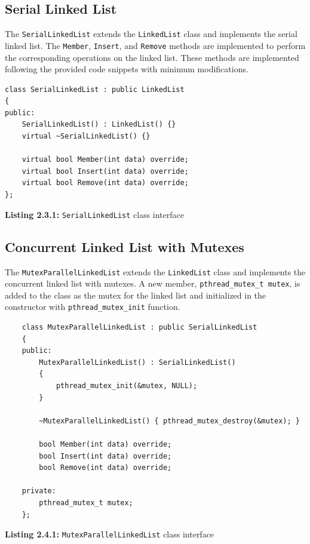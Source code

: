 \documentclass[a4paper,12pt]{article}
\begin{document}
\subsection{Serial Linked List}

The \lstinline|SerialLinkedList| extends the \lstinline|LinkedList| class and implements the serial linked list. The \lstinline|Member|, \lstinline|Insert|, and \lstinline|Remove| methods are implemented to perform the corresponding operations on the linked list. These methods are implemented following the provided code snippets with minimum modifications.

\begin{lstlisting}
class SerialLinkedList : public LinkedList
{
public:
    SerialLinkedList() : LinkedList() {}
    virtual ~SerialLinkedList() {}

    virtual bool Member(int data) override;
    virtual bool Insert(int data) override;
    virtual bool Remove(int data) override;
};
\end{lstlisting}
\begin{center}
    \textbf{Listing 2.3.1:} \lstinline|SerialLinkedList| class interface
\end{center}

\subsection{Concurrent Linked List with Mutexes}

The \lstinline|MutexParallelLinkedList| extends the \lstinline|LinkedList| class and implements the concurrent linked list with mutexes. A new member, \lstinline|pthread_mutex_t mutex|, is added to the class as the mutex for the linked list and initialized in the constructor with \lstinline|pthread_mutex_init| function.

\begin{lstlisting}
    class MutexParallelLinkedList : public SerialLinkedList
    {
    public:
        MutexParallelLinkedList() : SerialLinkedList()
        {
            pthread_mutex_init(&mutex, NULL);
        }
    
        ~MutexParallelLinkedList() { pthread_mutex_destroy(&mutex); }
    
        bool Member(int data) override;
        bool Insert(int data) override;
        bool Remove(int data) override;
    
    private:
        pthread_mutex_t mutex;
    };
\end{lstlisting}
\begin{center}
    \textbf{Listing 2.4.1:} \lstinline|MutexParallelLinkedList| class interface
\end{center}
\end{document}
